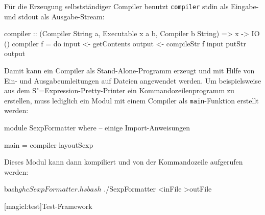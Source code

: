 \documentclass[12pt, a4paper, bibgerm]{scrbook}
\newenvironment{DIFnomarkup}{}{}
\newcommand\icode[1]{\lstinline?#1?}
\newcommand\lsection{}
\newcommand{\sexp}{S"=Expression}
\begin{document}
Für die Erzeugung selbstständiger Compiler benutzt \icode{compiler}
stdin als Eingabe- und stdout als Ausgabe-Stream:
\begin{DIFnomarkup}\begin{code}
compiler :: (Compiler String a, Executable x a b, Compiler b String) => x -> IO ()
compiler f = do
  input <- getContents
  output <- compileStr f input
  putStr output  
\end{code}\end{DIFnomarkup}
Damit kann ein Compiler als Stand-Alone-Programm erzeugt und mit Hilfe
von Ein- und Ausgabeumleitungen auf Dateien angewendet werden. Um
beispielsweise aus dem \sexp{}-Pretty-Printer ein Kommandozeilenprogramm
zu erstellen, muss lediglich ein Modul mit einem Compiler als
\icode{main}-Funktion erstellt werden: 
\begin{DIFnomarkup}\begin{code}
module SexpFormatter where
-- einige Import-Anweisungen

main = compiler layoutSexp
\end{code}\end{DIFnomarkup}
Dieses Modul kann dann kompiliert und von der Kommandozeile
aufgerufen werden:
\begin{DIFnomarkup}\begin{code}
bash$ ghc SexpFormatter.hs
bash$ ./SexpFormatter <inFile >outFile
\end{code}\end{DIFnomarkup}

\lsection[magicl:test]{Test-Framework}
\end{document}
